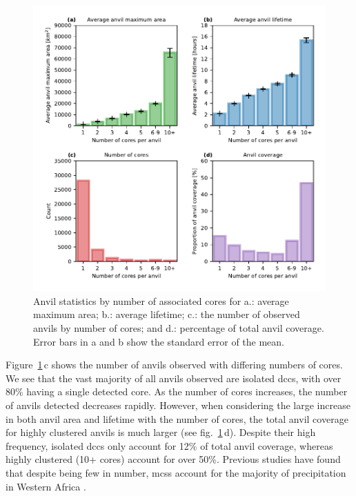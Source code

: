 \documentclass[acp, manuscript]{copernicus}
\begin{document}
\begin{figure}[tp]
    \includegraphics[width=12cm]{figures/fig06.pdf}
    \caption[
    Anvil statistics by number of associated cores for average maximum area, average lifetime, occurrence of anvils by number of cores, and percentage of total anvil coverage
    ]{
    Anvil statistics by number of associated cores for a.: average maximum area; b.: average lifetime; c.: the number of observed anvils by number of cores; and d.: percentage of total anvil coverage. Error bars in a and b show the standard error of the mean.
    }
    \label{fig:seviri_anvil_stats}
\end{figure}


Figure~\ref{fig:seviri_anvil_stats}\,c shows the number of anvils observed with differing numbers of cores. 
We see that the vast majority of all anvils observed are isolated \acrshort{dcc}s, with over 80\% having a single detected core. 
As the number of cores increases, the number of anvils detected decreases rapidly. 
However, when considering the large increase in both anvil area and lifetime with the number of cores, the total anvil coverage for highly clustered anvils is much larger (see fig.~\ref{fig:seviri_anvil_stats}\,d). 
Despite their high frequency, isolated \acrshort{dcc}s only account for 12\% of total anvil coverage, whereas highly clustered (10+ cores) account for over 50\%. 
Previous studies have found that despite being few in number, \acrshort{mcs}s account for the majority of precipitation in Western Africa \citep{vizy_understanding_2019}.
\end{document}
